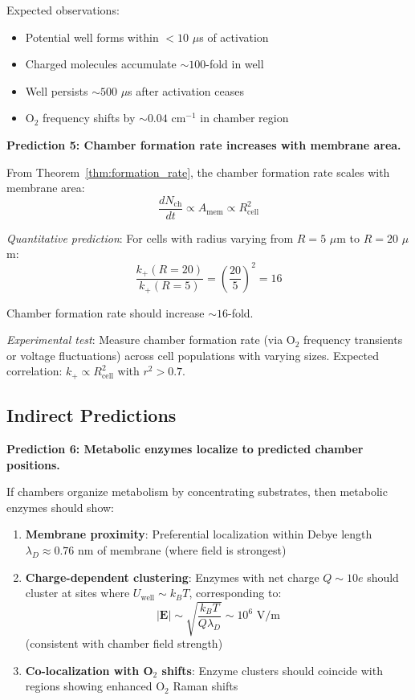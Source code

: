 \documentclass[twocolumn,10pt,aps,prd,superscriptaddress,floatfix,nofootinbib]{revtex4-2}
\theoremstyle{remark}
\begin{document}
Expected observations:
\begin{itemize}
\item Potential well forms within $<10$ $\mu$s of activation
\item Charged molecules accumulate $\sim 100$-fold in well
\item Well persists $\sim 500$ $\mu$s after activation ceases
\item O$_2$ frequency shifts by $\sim 0.04$ cm$^{-1}$ in chamber region
\end{itemize}

\textbf{Prediction 5: Chamber formation rate increases with membrane area.}

From Theorem~\ref{thm:formation_rate}, the chamber formation rate scales with membrane area:
\begin{equation}
\frac{dN_{\mathrm{ch}}}{dt} \propto A_{\mathrm{mem}} \propto R_{\mathrm{cell}}^2
\label{eq:pred_chamber_rate_scaling}
\end{equation}

\textit{Quantitative prediction}: For cells with radius varying from $R = 5$ $\mu$m to $R = 20$ $\mu$m:
\begin{equation}
\frac{k_+(R=20)}{k_+(R=5)} = \left(\frac{20}{5}\right)^2 = 16
\end{equation}

Chamber formation rate should increase $\sim 16$-fold.

\textit{Experimental test}: Measure chamber formation rate (via O$_2$ frequency transients or voltage fluctuations) across cell populations with varying sizes. Expected correlation: $k_+ \propto R_{\mathrm{cell}}^2$ with $r^2 > 0.7$.

\subsection{Indirect Predictions}

\textbf{Prediction 6: Metabolic enzymes localize to predicted chamber positions.}

If chambers organize metabolism by concentrating substrates, then metabolic enzymes should show:
\begin{enumerate}
\item \textbf{Membrane proximity}: Preferential localization within Debye length $\lambda_D \approx 0.76$ nm of membrane (where field is strongest)
\item \textbf{Charge-dependent clustering}: Enzymes with net charge $Q \sim 10e$ should cluster at sites where $U_{\mathrm{well}} \sim k_B T$, corresponding to:
\begin{equation}
|\mathbf{E}| \sim \sqrt{\frac{k_B T}{Q \lambda_D}} \sim 10^6 \text{ V/m}
\end{equation}
(consistent with chamber field strength)
\item \textbf{Co-localization with O$_2$ shifts}: Enzyme clusters should coincide with regions showing enhanced O$_2$ Raman shifts
\end{enumerate}
\end{document}
